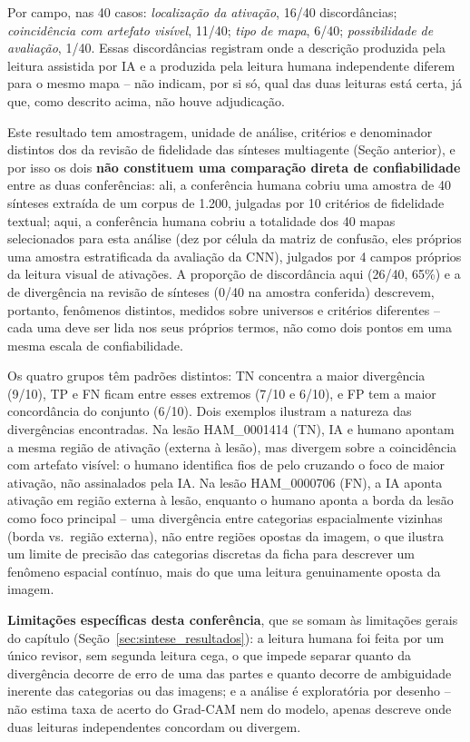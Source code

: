 Por campo, nas 40 casos: \textit{localização da ativação}, 16/40 discordâncias; \textit{coincidência com artefato visível}, 11/40; \textit{tipo de mapa}, 6/40; \textit{possibilidade de avaliação}, 1/40. Essas discordâncias registram onde a descrição produzida pela leitura assistida por IA e a produzida pela leitura humana independente diferem para o mesmo mapa -- não indicam, por si só, qual das duas leituras está certa, já que, como descrito acima, não houve adjudicação.

Este resultado tem amostragem, unidade de análise, critérios e denominador distintos dos da revisão de fidelidade das sínteses multiagente (Seção anterior), e por isso os dois \textbf{não constituem uma comparação direta de confiabilidade} entre as duas conferências: ali, a conferência humana cobriu uma amostra de 40 sínteses extraída de um corpus de 1.200, julgadas por 10 critérios de fidelidade textual; aqui, a conferência humana cobriu a totalidade dos 40 mapas selecionados para esta análise (dez por célula da matriz de confusão, eles próprios uma amostra estratificada da avaliação da CNN), julgados por 4 campos próprios da leitura visual de ativações. A proporção de discordância aqui (26/40, 65\%) e a de divergência na revisão de sínteses (0/40 na amostra conferida) descrevem, portanto, fenômenos distintos, medidos sobre universos e critérios diferentes -- cada uma deve ser lida nos seus próprios termos, não como dois pontos em uma mesma escala de confiabilidade.

Os quatro grupos têm padrões distintos: TN concentra a maior divergência (9/10), TP e FN ficam entre esses extremos (7/10 e 6/10), e FP tem a maior concordância do conjunto (6/10). Dois exemplos ilustram a natureza das divergências encontradas. Na lesão HAM\_0001414 (TN), IA e humano apontam a mesma região de ativação (externa à lesão), mas divergem sobre a coincidência com artefato visível: o humano identifica fios de pelo cruzando o foco de maior ativação, não assinalados pela IA. Na lesão HAM\_0000706 (FN), a IA aponta ativação em região externa à lesão, enquanto o humano aponta a borda da lesão como foco principal -- uma divergência entre categorias espacialmente vizinhas (borda vs.\ região externa), não entre regiões opostas da imagem, o que ilustra um limite de precisão das categorias discretas da ficha para descrever um fenômeno espacial contínuo, mais do que uma leitura genuinamente oposta da imagem.

\textbf{Limitações específicas desta conferência}, que se somam às limitações gerais do capítulo (Seção~\ref{sec:sintese_resultados}): a leitura humana foi feita por um único revisor, sem segunda leitura cega, o que impede separar quanto da divergência decorre de erro de uma das partes e quanto decorre de ambiguidade inerente das categorias ou das imagens; e a análise é exploratória por desenho -- não estima taxa de acerto do Grad-CAM nem do modelo, apenas descreve onde duas leituras independentes concordam ou divergem.

